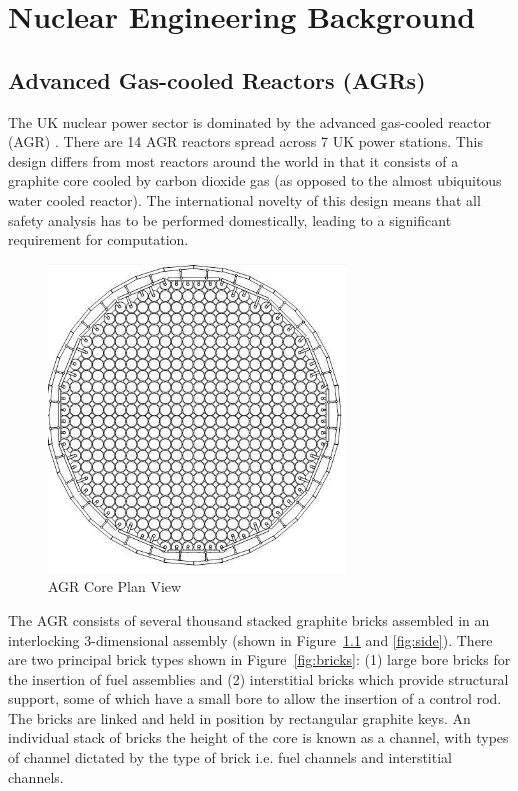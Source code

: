 \chapter{Nuclear Engineering Background}
\label{cha:engineering}

\section{Advanced Gas-cooled Reactors (AGRs)} \label{AGR}

The UK nuclear power sector is dominated by the advanced gas-cooled reactor  (AGR) \cite{nonbol1996description}. There are 14 AGR reactors spread across 7 UK power stations. This design differs from most reactors around the world in that it consists of a graphite core cooled by carbon dioxide gas (as opposed to the almost ubiquitous water cooled reactor). The international novelty of this design means that all safety analysis has to be performed domestically, leading to a significant requirement for computation.

\begin{figure}[ht!]
	\centering
	\includegraphics[scale=0.75]{Figures/AGR_plan.png}
	\caption{AGR Core Plan View}
	\label{fig:schematic}
\end{figure}

\noindent
The AGR consists of several thousand stacked graphite bricks assembled in an interlocking 3-dimensional assembly (shown in Figure~\ref{fig:schematic} and \ref{fig:side}). There are two principal brick types shown in Figure~\ref{fig:bricks}: (1) large bore bricks for the insertion of fuel assemblies and (2) interstitial bricks which provide structural support, some of which have a small bore to allow the insertion of a control rod. The bricks are linked and held in position by rectangular graphite keys. An individual stack of bricks the height of the core is known as a channel, with types of channel dictated by the type of brick i.e. fuel channels and interstitial channels.

